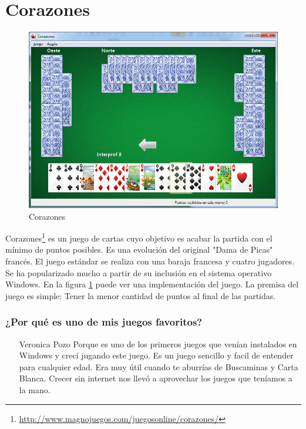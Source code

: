 \section{Corazones}

\begin{figure}[htbp]
\begin{center}
\includegraphics[width=.60\textwidth]{./imagenes/Corazones.png}
\caption{Corazones}
\label{Corazones}
\end{center}
\end{figure}
Corazones\footnote{\url{http://www.magnojuegos.com/juegosonline/corazones/}} es un juego de cartas cuyo objetivo es acabar la partida con el mínimo de puntos posibles. Es una evolución del original "Dama de Picas" francés. El juego estándar se realiza con una baraja francesa y cuatro jugadores. Se ha popularizado mucho a partir de su inclusión en el sistema operativo Windows.
En la figura \ref{Corazones} puede ver una implementación del juego.
La premisa del juego es simple: Tener la menor cantidad de puntos al final de las partidas.

\subsubsection{¿Por qué es uno de mis juegos favoritos?}
\begin{itemize}
\item[Veronica Pozo] Porque es uno de los primeros juegos que venían instalados en Windows y crecí jugando este juego. Es un juego sencillo y facil de entender para cualquier edad. Era muy útil cuando te aburrías de Buscaminas y Carta Blanca. Crecer sin internet nos llevó a aprovechar los juegos que teníamos a la mano.
\end{itemize}
